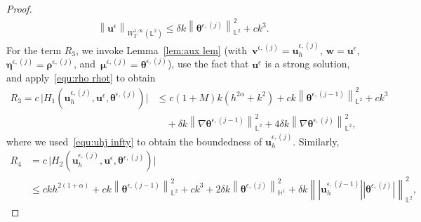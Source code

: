 \documentclass[11pt,reqno]{amsart}
\theoremstyle{definition}
\numberwithin{equation}{section}
\newcommand{\bff}{\boldsymbol}
\newcommand{\bb}{\mathbb}
\newcommand{\nn}{\nonumber}
\newcommand{\norm}[2]{\left\|{#1}\right\|_{#2}}
\begin{document}
\begin{proof}
\begin{align*}
	\norm{\bff{u}^\epsilon}{W^{1,\infty}_T(\bb{L}^2)}
	\le
	\delta k \norm{\bff{\theta}^{\epsilon, (j)}}{\bb{L}^2}^2
	+
	ck^3.
\end{align*}
For the term $R_3$, we invoke Lemma~\ref{lem:aux lem} (with~$\bff{v}^{\epsilon, (j)}=\bff{u}_h^{\epsilon, (j)}$,
$\bff{w}=\bff{u}^\epsilon$, $\bff{\eta}^{\epsilon, (j)}=\bff{\rho}^{\epsilon, (j)}$,
and~$\bff{\mu}^{\epsilon, (j)}=\bff{\theta}^{\epsilon, (j)}$), use the fact that $\bff{u}^\epsilon$ is a strong solution, and apply~\eqref{equ:rho rhot} to obtain 
\begin{align}\label{equ:R3}
	R_3
	=
	c\, \big| H_1(\bff{u}_h^{\epsilon, (j)},\bff{u}^\epsilon,\bff{\theta}^{\epsilon, (j)}) \big|
	&\le
	c(1+M) k (h^{2\alpha}+k^2) 
	+ c k \norm{\bff{\theta}^{\epsilon, (j-1)}}{\bb{L}^2}^2
	+ c k^3 
	\nn\\
	&\quad
	+ \delta k \norm{\nabla \bff{\theta}^{\epsilon, (j-1)}}{\bb{L}^2}^2
	+ 4\delta k \norm{\nabla \bff{\theta}^{\epsilon, (j)}}{\bb{L}^2}^2,
\end{align}
where we used~\eqref{equ:uhj infty} to
obtain the boundedness of $\bff{u}_h^{\epsilon, (j)}$.
Similarly,
\begin{align*} 
	R_4
	&=
	c\, \big| H_2(\bff{u}_h^{\epsilon, (j)},\bff{u}^\epsilon,\bff{\theta}^{\epsilon, (j)}) \big|
\\
	&\leq
	ck h^{2(1+\alpha)} 
	+
	c k \norm{\bff{\theta}^{\epsilon, (j-1)}}{\bb{L}^2}^2
	+
	ck^3
	+
	2 \delta k \norm{\bff{\theta}^{\epsilon, (j)}}{\bb{H}^1}^2
		+
		\delta k
		\norm{|\bff{u}_h^{\epsilon, (j-1)}||\bff{\theta}^{\epsilon, (j)}|}{\bb{L}^2}^2,

\end{align*}
\end{proof}
\end{document}
